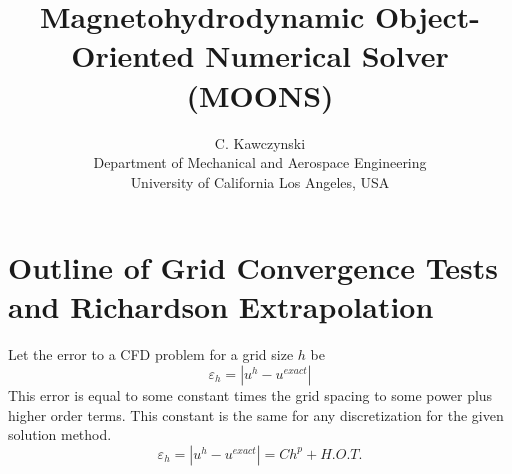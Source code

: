 \documentclass[11pt]{article}
\begin{document}
\doublespacing
\title{Magnetohydrodynamic Object-Oriented Numerical Solver (MOONS)}
\author{C. Kawczynski \\
Department of Mechanical and Aerospace Engineering \\
University of California Los Angeles, USA\\
}
\maketitle

\section{Outline of Grid Convergence Tests and Richardson Extrapolation}
Let the error to a CFD problem for a grid size $h$ be
\begin{equation}
	\varepsilon_{h} = |u^{h} - u^{exact}|
\end{equation}
This error is equal to some constant times the grid spacing to some power plus higher order terms. This constant is the same for any discretization for the given solution method.
\begin{equation}
	\varepsilon_{h} 
	=
	|u^{h} - u^{exact}|
	=
	C h^p + H.O.T.
\end{equation}
\end{document}
